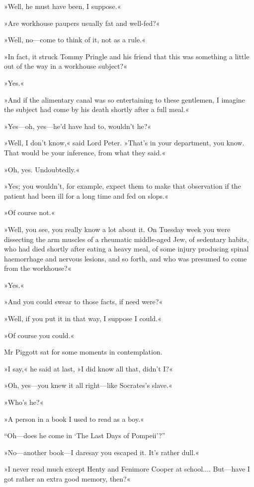 »Well, he must have been, I suppose.«

»Are workhouse paupers usually fat and well-fed?«

»Well, no—come to think of it, not as a rule.«

»In fact, it struck Tommy Pringle and his friend that this was something a little out of the way in a workhouse subject?«

»Yes.«

»And if the alimentary canal was so entertaining to these gentlemen, I imagine the subject had come by his death shortly after a full meal.«

»Yes—oh, yes—he'd have had to, wouldn't he?«

»Well, I don't know,« said Lord Peter. »That's in your department, you know. That would be your inference, from what they said.«

»Oh, yes. Undoubtedly.«

»Yes; you wouldn't, for example, expect them to make that observation if the patient had been ill for a long time and fed on slops.«

»Of course not.«

»Well, you see, you really know a lot about it. On Tuesday week you were dissecting the arm muscles of a rheumatic middle-aged Jew, of sedentary habits, who had died shortly after eating a heavy meal, of some injury producing spinal haemorrhage and nervous lesions, and so forth, and who was presumed to come from the workhouse?«

»Yes.«

»And you could swear to those facts, if need were?«

»Well, if you put it in that way, I suppose I could.«

»Of course you could.«

Mr Piggott sat for some moments in contemplation.

»I say,« he said at last, »I did know all that, didn't I?«

»Oh, yes—you knew it all right—like Socrates's slave.«

»Who's he?«

»A person in a book I used to read as a boy.«

“Oh—does he come in ‘The Last Days of Pompeii'?”

»No—another book—I daresay you escaped it. It's rather dull.«

»I never read much except Henty and Fenimore Cooper at school.... But—have I got rather an extra good memory, then?«

